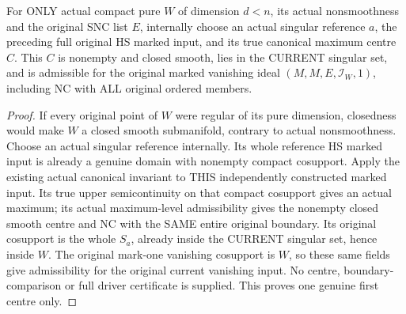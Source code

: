 \begin{theorem}
\label{hir:actual-current-full-hs-singular-first-centre}
\leanok
For ONLY actual compact pure $W$ of dimension $d<n$, its actual nonsmoothness
and the original SNC list $E$, internally choose an actual singular reference
$a$, the preceding full original HS marked input, and its true canonical
maximum centre $C$. This $C$ is nonempty and closed smooth, lies in the
CURRENT singular set, and is admissible for the original marked vanishing
ideal $(M,M,E,\mathcal I_W,1)$, including NC with ALL original ordered members.
\end{theorem}
\begin{proof}
If every original point of $W$ were regular of its pure dimension, closedness
would make $W$ a closed smooth submanifold, contrary to actual nonsmoothness.
Choose an actual singular reference internally. Its whole reference HS
marked input is already a genuine domain with nonempty compact cosupport.
Apply the existing actual canonical invariant to THIS independently
constructed marked input. Its true upper semicontinuity on that compact
cosupport gives an actual maximum; its actual maximum-level admissibility
gives the nonempty closed smooth centre and NC with the SAME entire original
boundary. Its original cosupport is the whole $S_a$, already inside the
CURRENT singular set, hence inside $W$. The original mark-one vanishing
cosupport is $W$, so these same fields give admissibility for the original
current vanishing input. No centre, boundary-comparison or full driver
certificate is supplied. This proves one genuine first centre only.
\end{proof}


